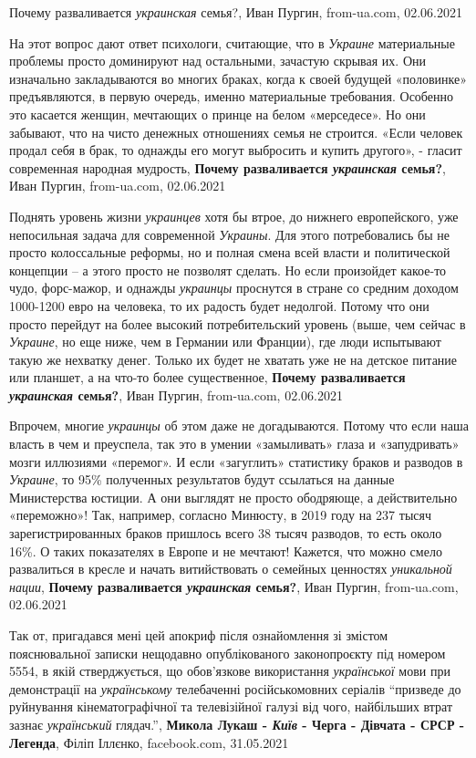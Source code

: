 Почему разваливается \emph{украинская} семья?, Иван Пургин, from-ua.com, 02.06.2021

На этот вопрос дают ответ психологи, считающие, что в \emph{Украине} материальные
проблемы просто доминируют над остальными, зачастую скрывая их. Они изначально
закладываются во многих браках, когда к своей будущей «половинке»
предъявляются, в первую очередь, именно материальные требования. Особенно это
касается женщин, мечтающих о принце на белом «мерседесе». Но они забывают, что
на чисто денежных отношениях семья не строится. «Если человек продал себя в
брак, то однажды его могут выбросить и купить другого», - гласит современная
народная мудрость,
\textbf{Почему разваливается \emph{украинская} семья?}, Иван Пургин, from-ua.com, 02.06.2021

Поднять уровень жизни \emph{украинцев} хотя бы втрое, до нижнего европейского, уже
непосильная задача для современной \emph{Украины}. Для этого потребовались бы не
просто колоссальные реформы, но и полная смена всей власти и политической
концепции – а этого просто не позволят сделать. Но если произойдет какое-то
чудо, форс-мажор, и однажды \emph{украинцы} проснутся в стране со средним доходом
1000-1200 евро на человека, то их радость будет недолгой. Потому что они просто
перейдут на более высокий потребительский уровень (выше, чем сейчас в \emph{Украине},
но еще ниже, чем в Германии или Франции), где люди испытывают такую же нехватку
денег. Только их будет не хватать уже не на детское питание или планшет, а на
что-то более существенное,
\textbf{Почему разваливается \emph{украинская} семья?}, Иван Пургин, from-ua.com, 02.06.2021

Впрочем, многие \emph{украинцы} об этом даже не догадываются. Потому что если наша
власть в чем и преуспела, так это в умении «замыливать» глаза и «запудривать»
мозги иллюзиями «перемог». И если «загуглить» статистику браков и разводов в
\emph{Украине}, то 95\% полученных результатов будут ссылаться на данные Министерства
юстиции. А они выглядят не просто ободряюще, а действительно «переможно»! Так,
например, согласно Минюсту, в 2019 году на 237 тысяч зарегистрированных браков
пришлось всего 38 тысяч разводов, то есть около 16\%. О таких показателях в
Европе и не мечтают! Кажется, что можно смело развалиться в кресле и начать
витийствовать о семейных ценностях \emph{уникальной нации},
\textbf{Почему разваливается \emph{украинская} семья?}, Иван Пургин, from-ua.com, 02.06.2021

Так от, пригадався мені цей апокриф після ознайомлення зі змістом пояснювальної
записки нещодавно опублікованого законопроєкту під номером 5554, в якій
стверджується, що обов'язкове використання \emph{української} мови при
демонстрації на \emph{українському} телебаченні російськомовних серіалів
\enquote{призведе до руйнування кінематографічної та телевізійної галузі від
чого, найбільших втрат зазнає \emph{український} глядач.},
\textbf{Микола Лукаш - \emph{Київ} - Черга - Дівчата - СРСР - Легенда}, Філіп Іллєнко, facebook.com, 31.05.2021

